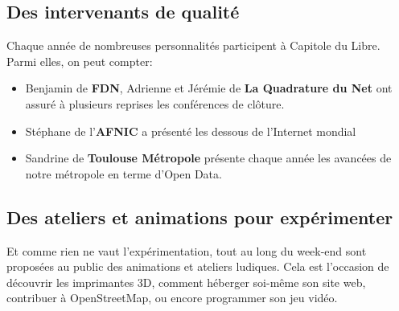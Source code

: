 \subsection{Des intervenants de qualité}

Chaque année de nombreuses personnalités participent à Capitole du Libre. Parmi elles, on peut compter:

\begin{itemize}[label=$\bullet$]
\item Benjamin  de \textbf{FDN}, Adrienne  et Jérémie  de \textbf{La Quadrature du Net} ont assuré à plusieurs reprises les conférences de clôture.
\item Stéphane  de l'\textbf{AFNIC} a présenté les dessous de l'Internet mondial
\item Sandrine  de \textbf{Toulouse Métropole} présente chaque année les avancées de notre métropole en terme d'Open Data.
\end{itemize} 

\subsection{Des ateliers et animations pour expérimenter}


\begin{minipage}{0.6\textwidth}
Et comme rien ne vaut l'expérimentation, tout au long du week-end sont 
proposées au public des animations et ateliers ludiques. Cela est 
l'occasion de découvrir les imprimantes 3D, comment héberger soi-même son 
site web, contribuer à OpenStreetMap, ou encore programmer son jeu vidéo.
\end{minipage}
\begin{minipage}{0.4\textwidth}
\end{minipage}

